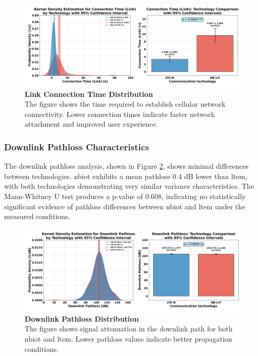 \documentclass[12pt, english, openany]{book}
\begin{document}
\begin{figure}[htbp]
    \centering
    \includegraphics[width=1.0\textwidth]{connection_time_link_kde_ci.png}
    \caption{\textbf{Link Connection Time Distribution} \\ The figure shows the time required to establish cellular network connectivity. Lower connection times indicate faster network attachment and improved user experience.}
    \label{fig:connection_time_link}
\end{figure}
\FloatBarrier
\subsubsection*{Downlink Pathloss Characteristics} \label{sec:downlink_pathloss_analysis}

The downlink pathloss analysis, shown in Figure \ref{fig:downlink_pathloss}, shows minimal differences between technologies. \gls{nbiot} exhibits a mean pathloss 0.4 dB lower than \gls{ltem}, with both technologies demonstrating very similar variance characteristics. The Mann-Whitney U test produces a p-value of 0.608, indicating no statistically significant evidence of pathloss differences between \gls{nbiot} and \gls{ltem} under the measured conditions.

\begin{figure}[htbp]
    \centering
    \includegraphics[width=1.0\textwidth]{downlink_pathloss_kde_ci.png}
    \caption{\textbf{Downlink Pathloss Distribution} \\ The figure shows signal attenuation in the downlink path for both \gls{nbiot} and \gls{ltem}. Lower pathloss values indicate better propagation conditions.}
    \label{fig:downlink_pathloss}
\end{figure}
\FloatBarrier
\end{document}
